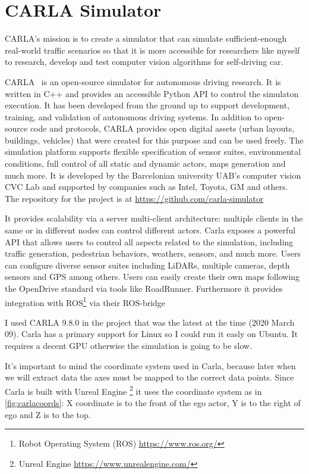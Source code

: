 \chapter{CARLA Simulator}
\label{chap:carlasim}

CARLA's mission is to create a simulator that can simulate sufficient-enough
real-world traffic scenarios so that it is more accessible for researchers like
myself to research, develop and test computer vision algorithms for
self-driving car. 

CARLA~\cite{Dosovitskiy17} is an open-source simulator for autonomous driving
research. It is written in C++ and provides an accessible Python API to
control the simulaton execution. It has been developed from the ground
up to support development, training, and validation of autonomous driving
systems. In addition to open-source code and protocols, CARLA provides open
digital assets (urban layouts, buildings, vehicles) that were created for this
purpose and can be used freely. The simulation platform supports flexible
specification of sensor suites, environmental conditions, full control of all
static and dynamic actors, maps generation and much more. It is developed by the
Barcelonian university UAB's computer vision CVC Lab and supported by companies
such as Intel, Toyota, GM and others. The repository for the project is at
\url{https://github.com/carla-simulator}

It provides scalability via a server multi-client architecture: multiple clients
in the same or in different nodes can control different actors. Carla exposes a
powerful API that allows users to control all aspects related to the simulation,
including traffic generation, pedestrian behaviors, weathers, sensors, and much
more. Users can configure diverse sensor suites including LiDARs, multiple
cameras, depth sensors and GPS among others. Users can easily create their own
maps following the OpenDrive standard via tools like RoadRunner. Furthermore it
provides integration with ROS\footnote{Robot Operating System (ROS)
\url{https://www.ros.org/}} via their ROS-bridge

I used CARLA 9.8.0 in the project that was the latest at the time (2020 March
09). Carla has a primary support for Linux so I could run it easly on Ubuntu. It
requires a decent GPU otherwise the simulation is going to be slow.

It's important to mind the coordinate system used in Carla, because later when
we will extract data the axes must be mapped to the correct data points. Since
Carla is built with Unreal Engine \footnote{Unreal Engine
\url{https://www.unrealengine.com/}} it uses the coordinate system as in
\autoref{fig:carlacoords}: X coordinate is to the front of the ego actor, Y is to the
right of ego and Z is to the top.

